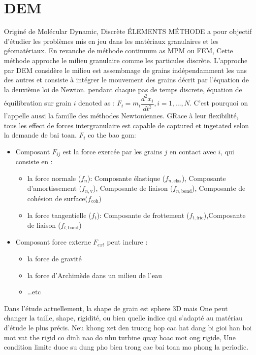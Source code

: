 \documentclass[a4paper,12pt]{report}
\begin{document}
\section{DEM}
Originé de Molécular Dynamic, Discrète ÉLEMENTS MÉTHODE a pour objectif d’étudier les problèmes mis en jeu dans les matériaux granulaires et les géomatériaux. En revanche de méthode continuum as MPM ou FEM, Cette méthode approche le milieu granulaire comme les particules discrète.
L’approche par DEM considère le milieu est assembmage de grains indépendamment les uns des autres et consiste à intégrer le mouvement des grains décrit par l’équation de la deuxième loi de Newton. pendant chaque pas de temps discrete, équation de équilibration sur grain $i$ denoted as : $F_i = m_i \dfrac{d^2x_i}{dt^2}, i = 1,\dots,N$.  
C’est pourquoi on l’appelle aussi la famille des méthodes Newtoniennes.
GRace à leur flexibilité, tous les effect de forces intergranulaire est capable de captured et ingetated selon la demande de bai toan. $F_i$ co the bao gom:
\begin{itemize}[label=$\bullet$]
    \item Composant $F_{ij}$ est la force exercée par les grains $j$ en contact avec $i$, qui consiste en :
    \begin{itemize}[label=$\cdot$]
        \item la force normale ($f_n$): Composante élastique ($f_{n,\mathrm{elas}}$), Composante d’amortissement ($f_{n,\mathrm{v}}$), Composante de liaison ($f_{n,\mathrm{bond}}$), Composante de cohésion de surface($f_{\mathrm{coh}}$)
        \item la force tangentielle ($f_t$): Composante de frottement ($f_{t,\mathrm{fric}}$),Composante de liaison ($f_{t,\mathrm{bond}}$) 
    \end{itemize}
    \item Composant force externe $F_{ext}$ peut inclure :
    \begin{itemize}
        \item la force de gravité
        \item la force d'Archimède dans un milieu de l'eau
        \item \dots etc
    \end{itemize}
\end{itemize} 
Dans l'étude actuellement, la shape de grain est sphere 3D mais One peut changer la taille, shape, rigidité, ou bien quelle indice qui s'adapté au matériau d'étude le plus précis. 
Neu khong xet den truong hop cac hat dang bi gioi han boi mot vat the rigid co dinh nao do nhu turbine quay hoac mot ong rigide, Une condition limite duoc su dung pho bien trong cac bai toan mo phong la periodic. 
\end{document}
